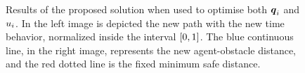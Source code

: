 \begin{figure}[!t]
\begin{center}
\begin{minipage}{.45\linewidth}
		\end{minipage}
	\end{center}
	\caption{Results of the proposed solution when used to optimise both $\boldsymbol{q}_i$ and $u_i$.
    In the left image is depicted the new path with the new time behavior, normalized inside the interval $\left[ 0,1 \right]$.
    The blue continuous line, in the right image, represents the new agent-obstacle distance, and the red dotted line is the
    fixed minimum safe distance.}%
    \label{FIG:ST-BEZIER-2D-PU-RESULT}
\end{figure}
\begin{figure}[!t]
	\begin{center}
		\begin{minipage}{.45\linewidth}
			\centering
		\end{minipage}
		\begin{minipage}{.45\linewidth}
			\centering

\end{minipage}
\end{center}
\end{figure}
